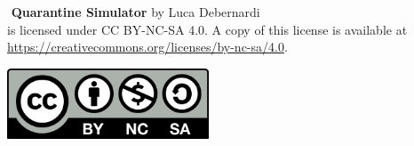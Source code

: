 \documentclass[a4paper, 12pt]{article}
\begin{document}
	$\text{}$
	\vfill
	\centering
	\textbf{Quarantine Simulator} by Luca Debernardi\\ is licensed under CC BY-NC-SA 4.0. A copy of this license is available at \url{https://creativecommons.org/licenses/by-nc-sa/4.0}.
	
	\begin{center}
		\includegraphics[width=0.45\textwidth]{IMG/CC-BY-NC-SA_icon.png}
	\end{center}
	
	
\end{document}

